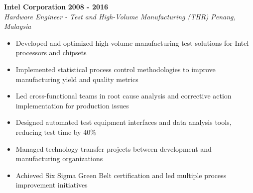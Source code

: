 \textbf{Intel Corporation} \hfill \textbf{2008 - 2016} \\
\textit{Hardware Engineer - Test and High-Volume Manufacturing (THR)} \hfill \textit{Penang, Malaysia} \\
\vspace{-0.4mm}
\begin{itemize}[leftmargin=0.5cm, label={\textbullet}]
\item Developed and optimized high-volume manufacturing test solutions for Intel processors and chipsets
\item Implemented statistical process control methodologies to improve manufacturing yield and quality metrics
\item Led cross-functional teams in root cause analysis and corrective action implementation for production issues
\item Designed automated test equipment interfaces and data analysis tools, reducing test time by 40\%
\item Managed technology transfer projects between development and manufacturing organizations
\item Achieved Six Sigma Green Belt certification and led multiple process improvement initiatives
\end{itemize}
\vspace{0.2mm}